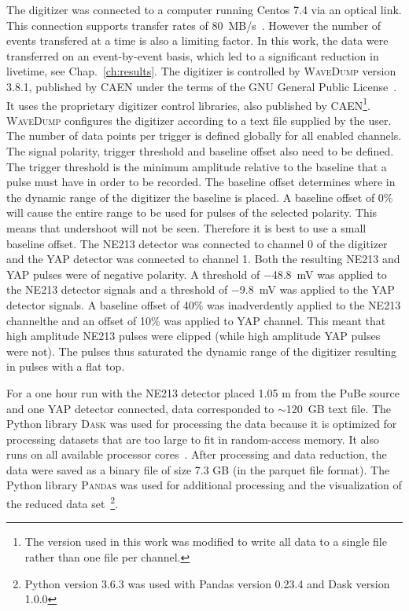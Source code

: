 \documentclass[main.tex]{subfiles}
\begin{document}
The digitizer was connected to a computer running Centos 7.4 via an optical link. This connection supports transfer rates of \SI{80}{MB/s}~\cite{CAEN}. However the number of events transfered at a time is also a limiting factor. In this work, the data were transferred on an event-by-event basis, which led to a significant reduction in livetime, see Chap.~\ref{ch:results}. The digitizer is controlled by \textsc{WaveDump} version 3.8.1, published by CAEN under the terms of the GNU General Public License~\cite{WaveDump}. It uses the proprietary digitizer control libraries, also published by CAEN\footnote{The version used in this work was modified to write all data to a single file rather than one file per channel.}. 
\textsc{WaveDump} configures the digitizer according to a text file supplied by the user. The number of data points per trigger is defined globally for all enabled channels. The signal polarity, trigger threshold and baseline offset also need to be defined. The trigger threshold is the minimum amplitude relative to the baseline that a pulse must have in order to be recorded. The baseline offset determines where in the dynamic range of the digitizer the baseline is placed. A baseline offset of 0\% will cause the entire range to be used for pulses of the selected polarity. This means that undershoot will not be seen. Therefore it is best to use a small baseline offset. The NE213 detector was connected to channel 0 of the digitizer and the YAP detector was connected to channel 1. Both the resulting NE213 and YAP pulses were of negative polarity. A threshold of \SI{-48.8}{mV} was applied to the NE213 detector signals and a threshold of \SI{-9.8}{mV} was applied to the YAP detector signals. A baseline offset of 40\% was inadverdently applied to the NE213 channelthe and an offset of 10\% was applied to  YAP channel. This meant that high amplitude NE213 pulses were clipped (while high amplitude YAP pulses were not). The pulses thus saturated the dynamic range of the digitizer resulting in pulses with a flat top.

For a one hour run with the NE213 detector placed 1.05 m from the PuBe source and one YAP detector connected, data corresponded to $\sim$\SI{120}{GB} text file. The Python library \textsc{Dask} was used for processing the data because it is optimized for processing datasets that are too large to fit in random-access memory. It also runs on all available processor cores~\cite{Dask}. After processing and data reduction, the data were saved as a binary file of size 7.3 GB (in the parquet file format). The Python library \textsc{Pandas} was used for additional processing and the visualization of the reduced data set~\cite{Pandas}\footnote{Python version 3.6.3 was used with Pandas version 0.23.4 and Dask version 1.0.0}.
\end{document}
